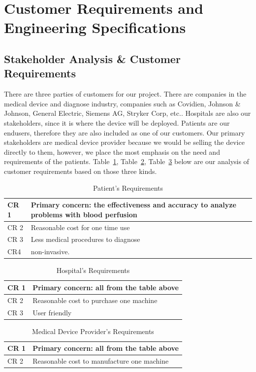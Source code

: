 \documentclass[paper=letter, fontsize=11pt]{scrartcl}
\numberwithin{equation}{section}		%
\numberwithin{figure}{section}			%
\numberwithin{table}{section}			%
\begin{document}
\section{Customer Requirements and Engineering Specifications}
\subsection{Stakeholder Analysis \& Customer Requirements}
There are three parties of customers for our project. There are companies in the medical device and diagnose industry, companies such as Covidien, Johnson \& Johnson, General Electric, Siemens AG, Stryker Corp, etc.\cite{cres1}. Hospitals are also our stakeholders, since it is where the device will be deployed. Patients are our endusers, therefore they are also included as one of our customers.
Our primary stakeholders are medical device provider because we would be selling the device directly to them, however, we place the most emphasis on the need and requirements of the patients. Table~\ref{Patients CR}, Table~\ref{Hospitals CR}, Table~\ref{Medical Devices CR} below are our analysis of customer requirements based on those three kinds.
\begin {table}[H]
\centering
\begin{tabular}{l|p{12cm}}
CR 1 & Primary concern: the effectiveness and accuracy to analyze problems with blood perfusion \\ \hline
CR 2 & Reasonable cost for one time use \\ \hline
CR 3 & Less medical procedures to diagnose \\ \hline
CR4 & non-invasive.
\end{tabular}
\caption{Patient's Requirements}
\label{Patients CR}
\end{table}

\begin {table}[H]
\centering
\begin{tabular}{l|p{12cm}}
CR 1 & Primary concern: all from the table above \\ \hline
CR 2 & Reasonable cost to purchase one machine \\ \hline
CR 3 & User friendly
\end{tabular}
\caption{Hospital's Requirements}
\label{Hospitals CR}
\end {table}

\begin {table}[H]
\centering
\begin{tabular}{l|p{12cm}}
CR 1 & Primary concern: all from the table above \\ \hline
CR 2 & Reasonable cost to manufacture one machine \\ \hline
\end{tabular}
\caption{Medical Device Provider's Requirements}
\label{Medical Devices CR}
\end {table}
\end{document}
